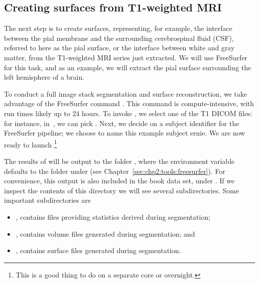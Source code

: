 \subsection{Creating surfaces from T1-weighted MRI}
\label{sec:chp3:surfaces}


The next step is to create surfaces, representing, for example, the
interface between the pial membrane and the surrounding cerebrospinal
fluid (CSF), referred to here as the pial surface, or the interface
between white and gray matter, from the T1-weighted MRI series just
extracted. We will use FreeSurfer for this task, and as an example, we
will extract the pial surface surrounding the left hemisphere of a
brain.

To conduct a full image stack segmentation and surface reconstruction,
we take advantage of the FreeSurfer command . This
command is compute-intensive, with run times likely up to 24
hours. To invoke , we select one of the T1 DICOM files:
for instance, in~, we can pick . Next, we
decide on a subject identifier for the FreeSurfer pipeline; we choose
to name this example subject ernie. We are now ready to launch
\footnote{This is a good thing to do on a separate
  core or overnight.}


The results of  will be output to the folder
, where the environment variable
 defaults to the  folder under
 (see
Chapter~\ref{sec:chp2:tools:freesurfer}). For convenience, this output
is also included in the book data set, under \emp{\ernieoutput}. If we
inspect the contents of this directory we will see several
subdirectories. Some important subdirectories are
\begin{itemize}
\item {}, contains files providing statistics derived during segmentation;
\item {}, contains volume files generated during segmentation; and
\item {}, contains surface files generated during segmentation.
\end{itemize}


